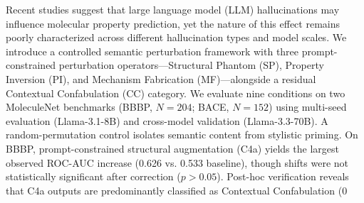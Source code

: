 Recent studies suggest that large language model (LLM) hallucinations may influence molecular property prediction, yet the nature of this effect remains poorly characterized across different hallucination types and model scales. We introduce a controlled semantic perturbation framework with three prompt-constrained perturbation operators—Structural Phantom (SP), Property Inversion (PI), and Mechanism Fabrication (MF)—alongside a residual Contextual Confabulation (CC) category. We evaluate nine conditions on two MoleculeNet benchmarks (BBBP, $N=204$; BACE, $N=152$) using multi-seed evaluation (Llama-3.1-8B) and cross-model validation (Llama-3.3-70B). A random-permutation control isolates semantic content from stylistic priming. On BBBP, prompt-constrained structural augmentation (C4a) yields the largest observed ROC-AUC increase (0.626 vs. 0.533 baseline), though shifts were not statistically significant after correction ($p > 0.05$). Post-hoc verification reveals that C4a outputs are predominantly classified as Contextual Confabulation (0%
